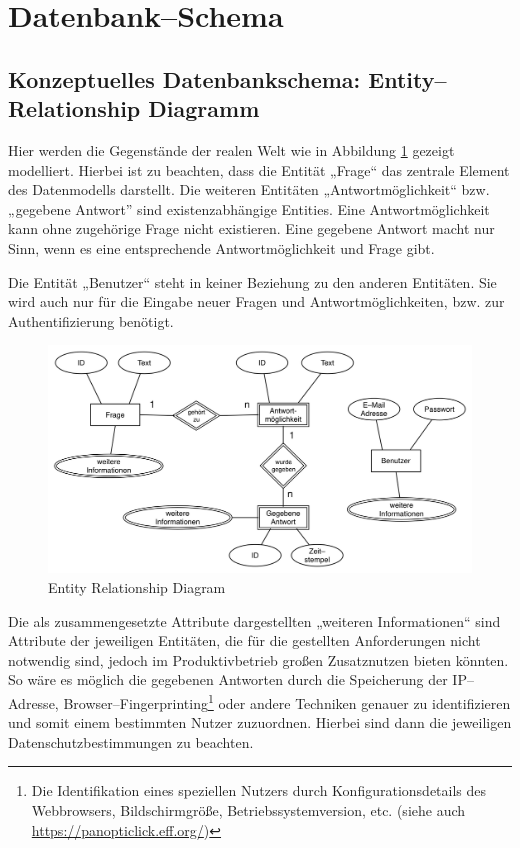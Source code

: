 \section{Datenbank--Schema}
\label{sec:dbschema}
\subsection{Konzeptuelles Datenbankschema: Entity--Relationship Diagramm}

Hier werden die Gegenstände der realen Welt wie in Abbildung \ref{fig:erd} gezeigt modelliert. Hierbei ist zu beachten, dass die Entität „Frage“ das zentrale Element des Datenmodells darstellt. Die weiteren Entitäten „Antwortmöglichkeit“ bzw. „gegebene Antwort” sind existenzabhängige Entities. Eine Antwortmöglichkeit kann ohne zugehörige Frage nicht existieren. Eine gegebene Antwort macht nur Sinn, wenn es eine entsprechende Antwortmöglichkeit und Frage gibt.

Die Entität „Benutzer“ steht in keiner Beziehung zu den anderen Entitäten. Sie wird auch nur für die Eingabe neuer Fragen und Antwortmöglichkeiten, bzw. zur Authentifizierung benötigt.

\begin{figure}[H]
\begin{center}
\includegraphics[width=\textwidth]{ERD.jpg}
\caption{Entity Relationship Diagram}
\label{fig:erd}
\end{center}
\end{figure}

Die als zusammengesetzte Attribute dargestellten „weiteren Informationen“ sind Attribute der jeweiligen Entitäten, die für die gestellten Anforderungen nicht notwendig sind, jedoch im Produktivbetrieb großen Zusatznutzen bieten könnten. So wäre es möglich die gegebenen Antworten durch die Speicherung der IP--Adresse, Browser--Fingerprinting\footnote{Die Identifikation eines speziellen Nutzers durch Konfigurationsdetails des Webbrowsers, Bildschirmgröße, Betriebssystemversion, etc. (siehe auch \url{https://panopticlick.eff.org/})} oder andere Techniken genauer zu identifizieren und somit einem bestimmten Nutzer zuzuordnen. Hierbei sind dann die jeweiligen Datenschutzbestimmungen zu beachten.


